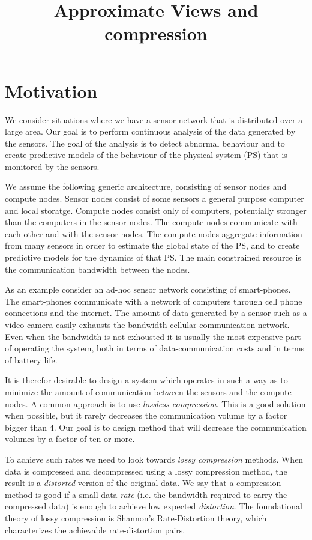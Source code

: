 \documentclass[11pt]{article}
\title{Approximate Views and compression}
\begin{document}
\maketitle

\section{Motivation}
We consider situations where we have a sensor network that is
distributed over a large area. Our goal is to perform continuous
analysis of the data generated by the sensors. The goal of the
analysis is to detect abnormal behaviour and to create predictive
models of the behaviour of the physical system (PS) that is monitored
by the sensors.

We assume the following generic architecture, consisting of sensor
nodes and compute nodes. Sensor nodes consist of some sensors a
general purpose computer and local storatge. Compute nodes consist
only of computers, potentially stronger than the computers in the
sensor nodes. The compute nodes communicate with each other and with
the sensor nodes. The compute nodes aggregate information from many
sensors in order to estimate the global state of the PS,
and to create predictive models for the dynamics of that PS.
The main constrained resource is the communication bandwidth between
the nodes.

As an example consider an ad-hoc sensor network consisting of
smart-phones. The smart-phones communicate with a network of computers
through cell phone connections and the internet.  The amount of data
generated by a sensor such as a video camera easily exhausts the
bandwidth cellular communication network. Even when the bandwidth is
not exhousted it is usually the most expensive part of operating the
system, both in terms of data-communication costs and in terms of
battery life.

It is therefor desirable to design a system which operates in
such a way as to minimize the amount of communication between the
sensors and the compute nodes. A common approach is to use {\em
  lossless compression}. This is a good solution when possible, but it
rarely decreases the communication volume by a factor bigger than 4.
Our goal is to design method that will decrease the communication
volumes by a factor of ten or more.

To achieve such rates we need to look towards {\em lossy compression}
methods. When data is compressed and decompressed using a lossy
compression method, the result is a {\em distorted} version of the
original data. We say that a compression method is good if a small
data {\em rate} (i.e. the bandwidth required to carry the compressed
data) is enough to achieve low expected {\em distortion}. The
foundational theory of lossy compression is Shannon's Rate-Distortion
theory, which characterizes the achievable rate-distortion pairs.
\end{document}
